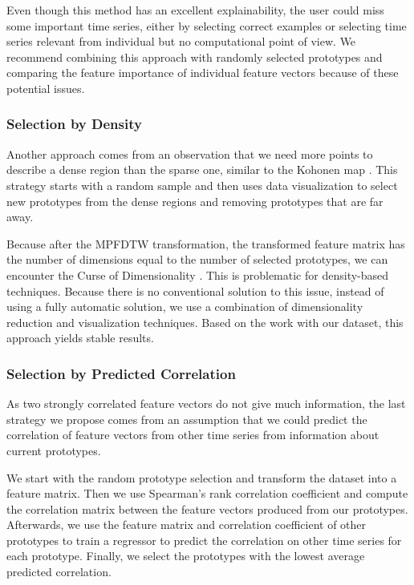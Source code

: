 Even though this method has an excellent explainability, the user could miss some important time series, either by selecting correct examples or selecting time series relevant from individual but no computational point of view. We recommend combining this approach with randomly selected prototypes and comparing the feature importance of individual feature vectors because of these potential issues.

\subsubsection{Selection by Density}
Another approach comes from an observation that we need more points to describe a dense region than the sparse one, similar to the Kohonen map \cite{exp:Kohonen1982}. This strategy starts with a random sample and then uses data visualization to select new prototypes from the dense regions and removing prototypes that are far away.

Because after the MPFDTW transformation, the transformed feature matrix has the number of dimensions equal to the number of selected prototypes, we can encounter the Curse of Dimensionality \cite{exp:curse-of-dim}. This is problematic for density-based techniques. Because there is no conventional solution to this issue, instead of using a fully automatic solution, we use a combination of dimensionality reduction and visualization techniques. Based on the work with our dataset, this approach yields stable results.

\subsubsection{Selection by Predicted Correlation}
As two strongly correlated feature vectors do not give much information, the last strategy we propose comes from an assumption that we could predict the correlation of feature vectors from other time series from information about current prototypes. 

We start with the random prototype selection and transform the dataset into a feature matrix. Then we use Spearman's rank correlation coefficient and compute the correlation matrix between the feature vectors produced from our prototypes. Afterwards, we use the feature matrix and correlation coefficient of other prototypes to train a regressor to predict the correlation on other time series for each prototype. Finally, we select the prototypes with the lowest average predicted correlation.

